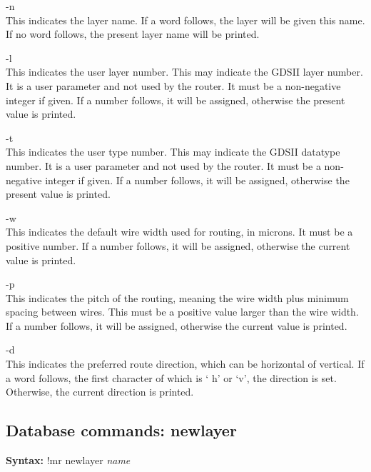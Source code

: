 \begin{description}
\item{\vt -n}\\
This indicates the layer name.  If a word follows, the layer will be
given this name.  If no word follows, the present layer name will be
printed.

\item{\vt -l}\\
This indicates the user layer number.  This may indicate the GDSII
layer number.  It is a user parameter and not used by the router.  It
must be a non-negative integer if given.  If a number follows, it will
be assigned, otherwise the present value is printed.

\item{\vt -t}\\
This indicates the user type number.  This may indicate the GDSII
datatype number.  It is a user parameter and not used by the router. 
It must be a non-negative integer if given.  If a number follows, it
will be assigned, otherwise the present value is printed.

\item{\vt -w}\\
This indicates the default wire width used for routing, in microns. 
It must be a positive number.  If a number follows, it will be
assigned, otherwise the current value is printed.

\item{\vt -p}\\
This indicates the pitch of the routing, meaning the wire width plus
minimum spacing between wires.  This must be a positive value larger
than the wire width.  If a number follows, it will be assigned,
otherwise the current value is printed.

\item{\vt -d}\\
This indicates the preferred route direction, which can be horizontal
of vertical.  If a word follows, the first character of which is `{\vt
h}' or `{\vt v}', the direction is set.  Otherwise, the current
direction is printed.
\end{description}

\subsection{Database commands: {\vt newlayer}}

{\bf Syntax:} {\vt !mr newlayer} {\it name}

